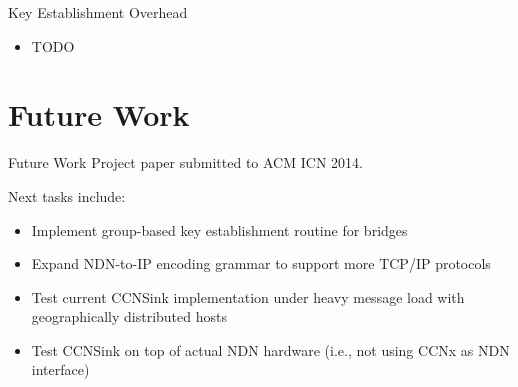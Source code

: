 \documentclass[handout]{beamer}
\begin{document}
\begin{frame}{Key Establishment Overhead}
	\begin{itemize}
		\item TODO
	\end{itemize}
\end{frame}

\section{Future Work}
\begin{frame}{Future Work}
	Project paper submitted to ACM ICN 2014.

	\medskip

	Next tasks include:
	\begin{itemize}
		\item Implement group-based key establishment routine for bridges
		\item Expand NDN-to-IP encoding grammar to support more TCP/IP protocols
		\item Test current {\sf CCNSink} implementation under heavy message load with geographically distributed hosts
		\item Test {\sf CCNSink} on top of actual NDN hardware (i.e., not using CCNx as NDN interface)
	\end{itemize}
\end{frame}


\end{document}
